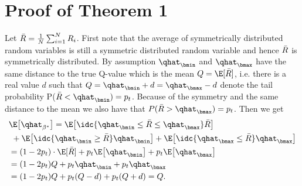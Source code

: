 \section{Proof of Theorem 1}


Let $\Bar{R} = \frac{1}{N} \sum_{i=1}^{N} R_i $.
First note that the average of symmetrically distributed random variables is still a symmetric distributed random variable and hence 
$\Bar{R} $ is symmetrically distributed.
By assumption $\qhat_{\bmin}$ and $\qhat_{\bmax}$ have the same  distance to the true Q-value which is the mean $Q=\E[\Bar{R}] $, i.e. there is a real value $d$ such that
$Q = \qhat_{\bmin} +d = \qhat_{\bmax} -d$
denote the tail probability  P($\Bar{R} < \qhat_{\bmin}) = p_t$.  
Because of the symmetry and the same distance to the mean we also have that  $P(\Bar{R} > \qhat_{\bmax}) = p_t$.
Then we get
\vspace{-0.1cm}
\begin{align*}
   &\E \big[ \qhat_{\beta^*} \big] 
   = \E \big[ \idc{\qhat_{\bmin} \leq \Bar{R} \leq \qhat_{\bmax}} \Bar{R}  \big]  \\
  & ~+  \E \big[ \idc{\qhat_{\bmin} \geq \Bar{R} }  \qhat_{\bmin} \big] +  \E \big[ \idc{\qhat_{\bmax} \leq \Bar{R} }  \qhat_{\bmax} \big]  \\
    &= (1-2p_t) \cdot \E[\Bar{R}] + p_t \E\big[\qhat_{\bmin}\big] + p_t \E\big[\qhat_{\bmax}\big] \\
   &= (1-2p_t) Q + p_t \qhat_{\bmin}+ p_t \qhat_{\bmax}\\
   &= (1-2p_t) Q + p_t (Q-d) + p_t (Q+d) = Q.
\end{align*}




